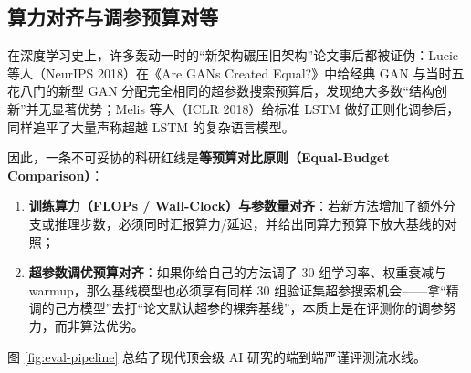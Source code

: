 \subsection{算力对齐与调参预算对等}

在深度学习史上，许多轰动一时的“新架构碾压旧架构”论文事后都被证伪：Lucic 等人（NeurIPS 2018）在《Are GANs Created Equal?》中给经典 GAN 与当时五花八门的新型 GAN 分配完全相同的超参数搜索预算后，发现绝大多数“结构创新”并无显著优势；Melis 等人（ICLR 2018）给标准 LSTM 做好正则化调参后，同样追平了大量声称超越 LSTM 的复杂语言模型。

因此，一条不可妥协的科研红线是\textbf{等预算对比原则（Equal-Budget Comparison）}：
\begin{enumerate}
  \item \textbf{训练算力（FLOPs / Wall-Clock）与参数量对齐}：若新方法增加了额外分支或推理步数，必须同时汇报算力/延迟，并给出同算力预算下放大基线的对照；
  \item \textbf{超参数调优预算对齐}：如果你给自己的方法调了 $30$ 组学习率、权重衰减与 warmup，那么基线模型也必须享有同样 $30$ 组验证集超参搜索机会——拿“精调的己方模型”去打“论文默认超参的裸奔基线”，本质上是在评测你的调参努力，而非算法优劣。
\end{enumerate}

图 \ref{fig:eval-pipeline} 总结了现代顶会级 AI 研究的端到端严谨评测流水线。

